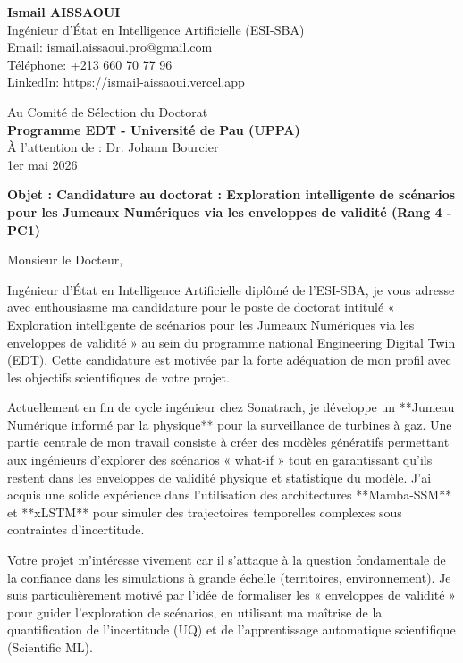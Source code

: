 \documentclass[11pt,a4paper]{article}
\begin{document}
\noindent \textbf{Ismail AISSAOUI} \\
Ingénieur d'État en Intelligence Artificielle (ESI-SBA) \\
Email: ismail.aissaoui.pro@gmail.com \\
Téléphone: +213 660 70 77 96 \\
LinkedIn: https://ismail-aissaoui.vercel.app

\bigskip

\begin{flushright}
    Au Comité de Sélection du Doctorat \\
    \textbf{Programme EDT - Université de Pau (UPPA)} \\
    À l'attention de : Dr. Johann Bourcier \\
    \medskip
    1er mai 2026
\end{flushright}

\bigskip

\noindent \textbf{Objet : Candidature au doctorat : Exploration intelligente de scénarios pour les Jumeaux Numériques via les enveloppes de validité (Rang 4 - PC1)}

\bigskip

Monsieur le Docteur,

Ingénieur d'État en Intelligence Artificielle diplômé de l'ESI-SBA, je vous adresse avec enthousiasme ma candidature pour le poste de doctorat intitulé « Exploration intelligente de scénarios pour les Jumeaux Numériques via les enveloppes de validité » au sein du programme national Engineering Digital Twin (EDT). Cette candidature est motivée par la forte adéquation de mon profil avec les objectifs scientifiques de votre projet.

Actuellement en fin de cycle ingénieur chez Sonatrach, je développe un **Jumeau Numérique informé par la physique** pour la surveillance de turbines à gaz. Une partie centrale de mon travail consiste à créer des modèles génératifs permettant aux ingénieurs d'explorer des scénarios « what-if » tout en garantissant qu'ils restent dans les enveloppes de validité physique et statistique du modèle. J'ai acquis une solide expérience dans l'utilisation des architectures **Mamba-SSM** et **xLSTM** pour simuler des trajectoires temporelles complexes sous contraintes d'incertitude.

Votre projet m'intéresse vivement car il s'attaque à la question fondamentale de la confiance dans les simulations à grande échelle (territoires, environnement). Je suis particulièrement motivé par l'idée de formaliser les « enveloppes de validité » pour guider l'exploration de scénarios, en utilisant ma maîtrise de la quantification de l'incertitude (UQ) et de l'apprentissage automatique scientifique (Scientific ML).
\end{document}
